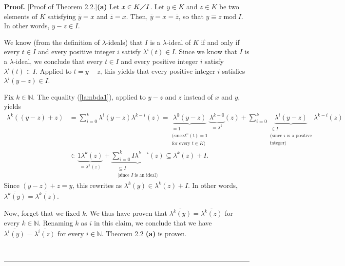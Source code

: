 \documentclass[numbers=enddot,12pt,final,onecolumn,notitlepage]{scrartcl}%
\newenvironment{proof}[1][Proof]{\noindent\textbf{#1.} }{\ \rule{0.5em}{0.5em}}
\begin{document}
\begin{proof}
[Proof of Theorem 2.2.]\textbf{(a)} Let $x\in K\diagup I$. Let $y\in K$ and
$z\in K$ be two elements of $K$ satisfying $\overline{y}=x$ and $\overline
{z}=x$. Then, $\overline{y}=x=\overline{z}$, so that $y\equiv
z\operatorname{mod}I$. In other words, $y-z\in I$.

We know (from the definition of $\lambda$-ideals) that $I$ is a $\lambda
$-ideal of $K$ if and only if every $t\in I$ and every positive integer $i$
satisfy $\lambda^{i}\left(  t\right)  \in I$. Since we know that $I$ is a
$\lambda$-ideal, we conclude that every $t\in I$ and every positive integer
$i$ satisfy $\lambda^{i}\left(  t\right)  \in I$. Applied to $t=y-z$, this
yields that every positive integer $i$ satisfies $\lambda^{i}\left(
y-z\right)  \in I$.

Fix $k\in\mathbb{N}$. The equality (\ref{lambda1}), applied to $y-z$ and $z$
instead of $x$ and $y$, yields%
\begin{align*}
\lambda^{k}\left(  \left(  y-z\right)  +z\right)   &  =\sum_{i=0}^{k}%
\lambda^{i}\left(  y-z\right)  \lambda^{k-i}\left(  z\right)
=\underbrace{\lambda^{0}\left(  y-z\right)  }_{\substack{=1\\\text{(since
}\lambda^{0}\left(  t\right)  =1\\\text{for every }t\in K\text{)}%
}}\underbrace{\lambda^{k-0}}_{=\lambda^{k}}\left(  z\right)  +\sum_{i=0}%
^{k}\underbrace{\lambda^{i}\left(  y-z\right)  }_{\substack{\in
I\\\text{(since }i\text{ is a positive}\\\text{integer)}}}\lambda^{k-i}\left(
z\right) \\
&  \in\underbrace{1\lambda^{k}\left(  z\right)  }_{=\lambda^{k}\left(
z\right)  }+\underbrace{\sum_{i=0}^{k}I\lambda^{k-i}\left(  z\right)
}_{\substack{\subseteq I\\\text{(since }I\text{ is an ideal)}}}\subseteq
\lambda^{k}\left(  z\right)  +I.
\end{align*}
Since $\left(  y-z\right)  +z=y$, this rewrites as $\lambda^{k}\left(
y\right)  \in\lambda^{k}\left(  z\right)  +I$. In other words, $\overline
{\lambda^{k}\left(  y\right)  }=\overline{\lambda^{k}\left(  z\right)  }$.

Now, forget that we fixed $k$. We thus have proven that $\overline{\lambda
^{k}\left(  y\right)  }=\overline{\lambda^{k}\left(  z\right)  }$ for every
$k\in\mathbb{N}$. Renaming $k$ as $i$ in this claim, we conclude that we have
$\overline{\lambda^{i}\left(  y\right)  }=\overline{\lambda^{i}\left(
z\right)  }$ for every $i\in\mathbb{N}$. Theorem 2.2 \textbf{(a)} is proven.


\end{proof}
\end{document}
